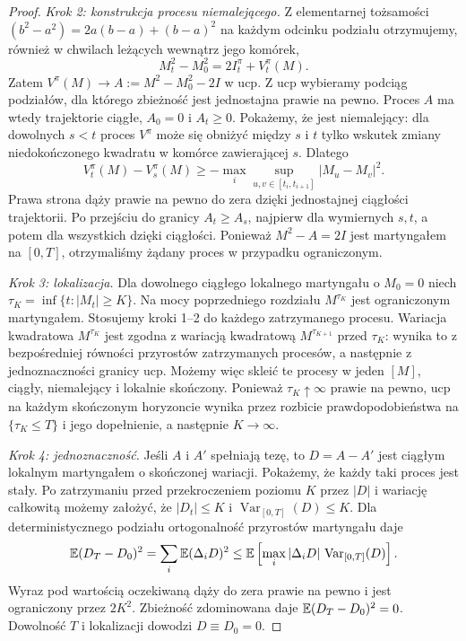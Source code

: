 \begin{proof}
\emph{Krok 2: konstrukcja procesu niemalejącego.}
Z elementarnej tożsamości
$(b^2-a^2)=2a(b-a)+(b-a)^2$
na każdym odcinku podziału otrzymujemy, również
w chwilach leżących wewnątrz jego komórek,
\[
M_t^2-M_0^2=2I_t^\pi+V_t^\pi(M).
\]
Zatem $V^\pi(M)\to A:=M^2-M_0^2-2I$ w ucp.
Z ucp wybieramy podciąg podziałów, dla którego
zbieżność jest jednostajna prawie na pewno.
Proces $A$ ma wtedy trajektorie ciągłe, $A_0=0$
i $A_t\ge0$. Pokażemy, że jest niemalejący:
dla dowolnych $s<t$ proces $V^\pi$ może się obniżyć
między $s$ i $t$ tylko wskutek zmiany niedokończonego
kwadratu w komórce zawierającej $s$. Dlatego
\[
V_t^\pi(M)-V_s^\pi(M)
\ge-\max_i\sup_{u,v\in[t_i,t_{i+1}]}
|M_u-M_v|^2.
\]
Prawa strona dąży prawie na pewno do zera dzięki
jednostajnej ciągłości trajektorii. Po przejściu
do granicy $A_t\ge A_s$, najpierw dla wymiernych
$s,t$, a potem dla wszystkich dzięki ciągłości.
Ponieważ $M^2-A=2I$ jest martyngałem na $[0,T]$,
otrzymaliśmy żądany proces w przypadku ograniczonym.

\emph{Krok 3: lokalizacja.}
Dla dowolnego ciągłego lokalnego martyngału o $M_0=0$
niech $\tau_K=\inf\{t:|M_t|\ge K\}$.
Na mocy poprzedniego rozdziału $M^{\tau_K}$ jest
ograniczonym martyngałem. Stosujemy kroki 1--2 do
każdego zatrzymanego procesu. Wariacja kwadratowa
$M^{\tau_K}$ jest zgodna z wariacją kwadratową
$M^{\tau_{K+1}}$ przed $\tau_K$: wynika to z
bezpośredniej równości przyrostów zatrzymanych
procesów, a następnie z jednoznaczności granicy
ucp. Możemy więc skleić te procesy w jeden
$[M]$, ciągły, niemalejący i lokalnie skończony.
Ponieważ $\tau_K\uparrow\infty$ prawie na pewno,
ucp na każdym skończonym horyzoncie wynika przez
rozbicie prawdopodobieństwa na $\{\tau_K\le T\}$
i jego dopełnienie, a następnie $K\to\infty$.

\emph{Krok 4: jednoznaczność.}
Jeśli $A$ i $A'$ spełniają tezę, to $D=A-A'$ jest
ciągłym lokalnym martyngałem o skończonej wariacji.
Pokażemy, że każdy taki proces jest stały.
Po zatrzymaniu przed przekroczeniem poziomu $K$ przez
$|D|$ i wariację całkowitą możemy założyć, że
$|D_t|\le K$ i $\operatorname{Var}_{[0,T]}(D)\le K$.
Dla deterministycznego podziału ortogonalność przyrostów
martyngału daje
\[
\mathbb{E}(D_T-D_0)^2=\sum_i\mathbb{E}(\Delta_iD)^2
\le\mathbb{E}\left[\max_i|\Delta_iD|\,
\operatorname{Var}_{[0,T]}(D)\right].
\]
Wyraz pod wartością oczekiwaną dąży do zera prawie
na pewno i jest ograniczony przez $2K^2$.
Zbieżność zdominowana daje $\mathbb{E}(D_T-D_0)^2=0$.
Dowolność $T$ i lokalizacji dowodzi $D\equiv D_0=0$.
\end{proof}

